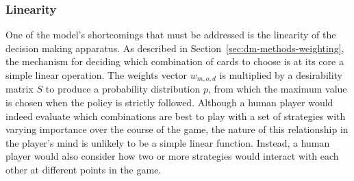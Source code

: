 
\subsubsection{Linearity}


One of the model's shortcomings that must be addressed is the linearity
of the decision making apparatus.
%
As described in Section~\ref{sec:dm-methods-weighting},
the mechanism for deciding which combination of cards to choose is\textemdash
at its core\textemdash
a simple linear operation.
%
The weights vector $w_{m,o,d}$ is multiplied by a desirability matrix $S$
to produce a probability distribution $p$,
from which the maximum value is chosen when the policy is strictly followed.
%
Although a human player would indeed evaluate which combinations are best
to play with a set of strategies with varying importance over the course
of the game,
the nature of this relationship in the player's mind is unlikely
to be a simple linear function.
%
Instead,
a human player would also consider how two or more strategies would interact
with each other at different points in the game.

